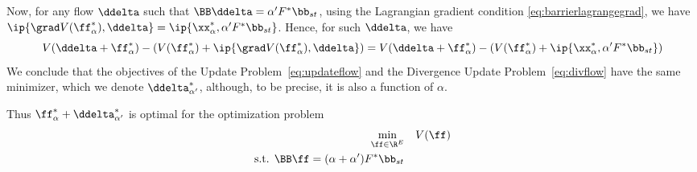 Now, for any flow $\ddelta$ such that $\BB\ddelta = \alpha' F^*
\bb_{st}$, using the Lagrangian gradient condition
\eqref{eq:barrierlagrangegrad},
we have
$\ip{\grad V(\ff^*_{\alpha}), \ddelta} = \ip{\xx^*_{\alpha}, \alpha' F^*
  \bb_{st}}$.
Hence, for such $\ddelta$, we have 
\[
    V(\ddelta+\ff^*_{\alpha})
  -
\left(
  V(\ff^*_{\alpha})
  +
  \ip{\grad V(\ff^*_{\alpha}), \ddelta}
\right)
=
    V(\ddelta+\ff^*_{\alpha})
  -
\left(
 V(\ff^*_{\alpha})
  +
\ip{\xx^*_{\alpha}, \alpha' F^*\bb_{st}}
\right)
\]
We conclude that the objectives of the Update
Problem~\eqref{eq:updateflow} and the Divergence Update
Problem~\eqref{eq:divflow} have the same minimizer, which we denote
$\ddelta^*_{\alpha'}$, although, to be precise, it is also a function of $\alpha$.




Thus $\ff^*_{\alpha}+\ddelta^*_{\alpha'}$ is optimal for the
optimization problem
  \begin{equation}
   \label{eq:barrierflowupdated}
\begin{aligned}
\min_{\ff \in \R^E} & \quad V(\ff)\\
\textrm{s.t. }  \BB\ff= (\alpha+\alpha') F^* \bb_{st}
\end{aligned}
\end{equation}

